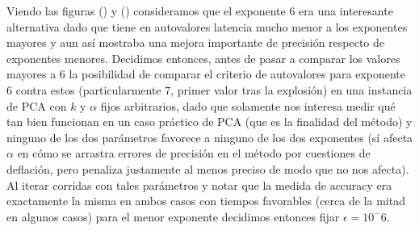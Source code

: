 Viendo las figuras () y () consideramos que el exponente $6$ era una interesante alternativa dado que tiene en autovalores latencia mucho menor a los exponentes mayores y aun así mostraba una mejora importante de precisión respecto de exponentes menores. Decidimos entonces, antes de pasar a comparar los valores mayores a $6$ la posibilidad de comparar el criterio de autovalores para exponente $6$ contra estos (particularmente $7$, primer valor tras la explosión) en una instancia de PCA con $k$ y $\alpha$ fijos arbitrarios, dado que solamente nos interesa medir qué tan bien funcionan en un caso práctico de PCA (que es la finalidad del método) y ninguno de los dos parámetros favorece a ninguno de los dos exponentes (sí afecta $\alpha$ en cómo se arrastra errores de precisión en el método por cuestiones de deflación, pero penaliza justamente al menos preciso de modo que no nos afecta). Al iterar corridas con tales parámetros y notar que la medida de accuracy era exactamente la misma en ambos casos con tiempos favorables (cerca de la mitad en algunos casos) para el menor exponente decidimos entonces fijar $\epsilon=10^-6$.
